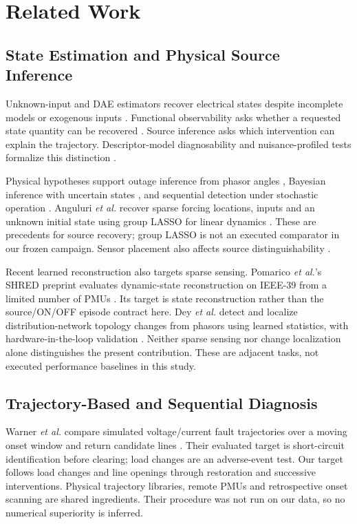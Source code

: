 \section{Related Work}
\label{sec:narrative-related}

\subsection{State Estimation and Physical Source Inference}
Unknown-input and DAE estimators recover electrical states despite
incomplete models or exogenous inputs
\cite{gillijns2007input,nugroho2022dae,katanic2024recursive}. Functional
observability asks whether a requested state quantity can be recovered
\cite{fernando2010functional,montanari2022functional}. Source inference asks
which intervention can explain the trajectory. Descriptor-model
diagnosability and nuisance-profiled tests formalize this distinction
\cite{eriksson2013diagnosability,scharf1994matched}.

Physical hypotheses support outage inference from phasor angles
\cite{tate2008outage}, Bayesian inference with uncertain states
\cite{zhao2014outages}, and sequential detection under stochastic operation
\cite{chen2016quickest,rovatsos2017outage}. Anguluri \emph{et al.} recover
sparse forcing locations, inputs and an unknown initial state using group
LASSO for linear dynamics \cite{anguluri2023group}. These are precedents
for source recovery; group LASSO is not an executed comparator in our
frozen campaign. Sensor placement also affects source distinguishability
\cite{jamei2020limits,conte2023fault,yildiz2025sparse}.

Recent learned reconstruction also targets sparse sensing. Pomarico
\emph{et al.}'s SHRED preprint evaluates dynamic-state reconstruction on
IEEE-39 from a limited number of PMUs \cite{pomarico2026shred}. Its target
is state reconstruction rather than the source/ON/OFF episode contract
here. Dey \emph{et al.} detect and localize distribution-network topology
changes from phasors using learned statistics, with hardware-in-the-loop
validation \cite{dey2026topology}. Neither sparse sensing nor change
localization alone distinguishes the present contribution. These are
adjacent tasks, not executed performance baselines in this study.

\subsection{Trajectory-Based and Sequential Diagnosis}
Warner \emph{et al.} compare simulated voltage/current fault trajectories
over a moving onset window and return candidate lines
\cite{warner2023highfidelity}. Their evaluated target is short-circuit
identification before clearing; load changes are an adverse-event test.
Our target follows load changes and line openings through restoration and
successive interventions. Physical trajectory libraries, remote PMUs and
retrospective onset scanning are shared ingredients. Their procedure was
not run on our data, so no numerical superiority is inferred.

